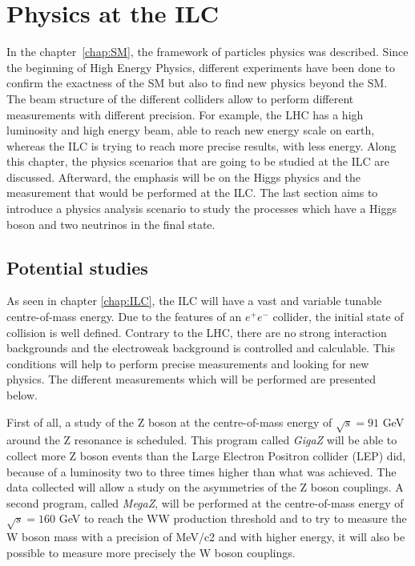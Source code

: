 \chapter{Physics at the ILC}

  In the chapter~\ref{chap:SM}, the framework of particles physics was described. 
  Since the beginning of High Energy Physics, different experiments have been done to confirm the exactness of the SM but also to find new physics beyond the SM. 
  The beam structure of the different colliders allow to perform different measurements with different precision. 
  For example, the LHC has a high luminosity and high energy beam, able to reach new energy scale on earth, whereas the ILC is trying to reach more precise results, with less energy. 
  Along this chapter, the physics scenarios that are going to be studied at the ILC are discussed. 
  Afterward, the emphasis will be on the Higgs physics and the measurement that would be performed at the ILC. 
  The last section aims to introduce a physics analysis scenario to study the processes which have a Higgs boson and two neutrinos in the final state.
 
 \minitoc

  \section{Potential studies}

  As seen in chapter \ref{chap:ILC}, the ILC will have a vast and variable tunable centre-of-mass energy.
  Due to the features of an $e^+e^-$ collider, the initial state of collision is well defined.
  Contrary to the LHC, there are no strong interaction backgrounds and the electroweak background is controlled and calculable.
  This conditions will help to perform precise measurements and looking for new physics. 
  The different measurements which will be performed are presented below.

   First of all, a study of the Z boson at the centre-of-mass energy of $\sqrt{s} = 91$ GeV around the Z resonance is scheduled. 
   This program called \textit{GigaZ} will be able to collect more Z boson events than the Large Electron Positron collider (LEP) did, because of a luminosity two to three times higher than what was achieved. 
   The data collected will allow a study on the asymmetries of the Z boson couplings. 
   A second program, called \textit{MegaZ}, will be performed at the centre-of-mass energy of $\sqrt{s} = 160$ GeV to reach the WW production threshold and to try to measure the W boson mass with a precision of MeV/c2 and with higher energy, it will also be possible to measure more precisely the W boson couplings.

